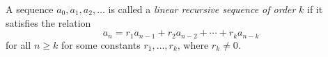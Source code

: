 

\setcounter{section}{1}
\setcounter{subsection}{3}
\setcounter{dfn}{4}

\begin{dfn}
A sequence $a_0, a_1, a_2, \ldots$ is called a \emph{linear recursive sequence of order} $k$
if it satisfies the relation
\begin{equation}
\label{eqn:LinReck}
a_n = r_1 a_{n-1} + r_2 a_{n-2} + \cdots + r_k a_{n-k}
\end{equation}
for all $n \ge k$ for some constants $r_1, \ldots, r_k$, where $r_k \ne 0$.
\end{dfn}


